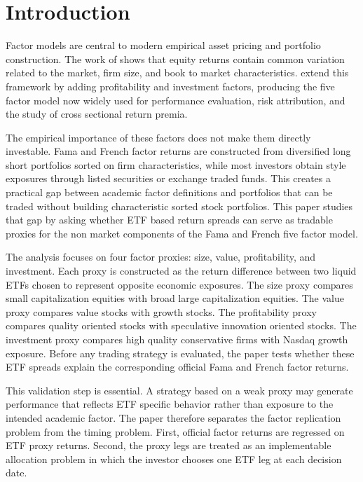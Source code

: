 \documentclass[investment,article,submit,pdftex,moreauthors]{Definitions/mdpi}
\begin{document}
\section{Introduction}

Factor models are central to modern empirical asset pricing and portfolio construction. The work of \citet{fama1993common} shows that equity returns contain common variation related to the market, firm size, and book to market characteristics. \citet{fama2015five} extend this framework by adding profitability and investment factors, producing the five factor model now widely used for performance evaluation, risk attribution, and the study of cross sectional return premia.

The empirical importance of these factors does not make them directly investable. Fama and French factor returns are constructed from diversified long short portfolios sorted on firm characteristics, while most investors obtain style exposures through listed securities or exchange traded funds. This creates a practical gap between academic factor definitions and portfolios that can be traded without building characteristic sorted stock portfolios. This paper studies that gap by asking whether ETF based return spreads can serve as tradable proxies for the non market components of the Fama and French five factor model.

The analysis focuses on four factor proxies: size, value, profitability, and investment. Each proxy is constructed as the return difference between two liquid ETFs chosen to represent opposite economic exposures. The size proxy compares small capitalization equities with broad large capitalization equities. The value proxy compares value stocks with growth stocks. The profitability proxy compares quality oriented stocks with speculative innovation oriented stocks. The investment proxy compares high quality conservative firms with Nasdaq growth exposure. Before any trading strategy is evaluated, the paper tests whether these ETF spreads explain the corresponding official Fama and French factor returns.

This validation step is essential. A strategy based on a weak proxy may generate performance that reflects ETF specific behavior rather than exposure to the intended academic factor. The paper therefore separates the factor replication problem from the timing problem. First, official factor returns are regressed on ETF proxy returns. Second, the proxy legs are treated as an implementable allocation problem in which the investor chooses one ETF leg at each decision date.
\end{document}
